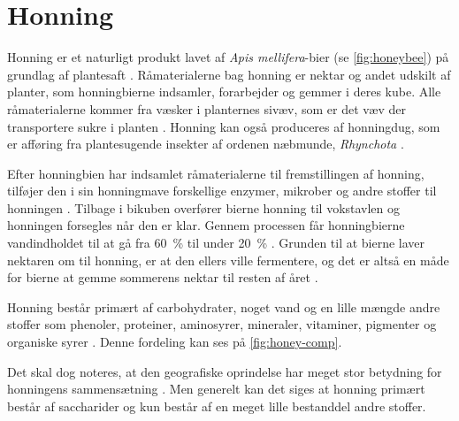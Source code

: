 \chapter{Honning}

Honning er et naturligt produkt lavet af \textit{Apis mellifera}-bier (se \cref{fig:honeybee}) på grundlag af plantesaft \parencite{honneyLex}.
Råmaterialerne bag honning er nektar og andet udskilt af planter, som honningbierne indsamler, forarbejder og gemmer i deres kube.
Alle råmaterialerne kommer fra væsker i planternes sivæv, som er det væv der transportere sukre i planten \parencite{sivævLex}.
\newline Honning kan også produceres af honningdug, som er afføring fra plantesugende insekter af ordenen næbmunde, \textit{Rhynchota} \parencite{honeybook}.
\par Efter honningbien har indsamlet råmaterialerne til fremstillingen af honning, tilføjer den i sin honningmave forskellige enzymer, mikrober og andre stoffer til honningen \parencite{sugarhoney}.
Tilbage i bikuben overfører bierne honning til vokstavlen og honningen forsegles når den er klar.
Gennem processen får honningbierne vandindholdet til at gå fra \qty{60}{\percent} til under \qty{20}{\percent} \parencite{honeybook}.
Grunden til at bierne laver nektaren om til honning, er at den ellers ville fermentere, og det er altså en måde for bierne at gemme sommerens nektar til resten af året \parencite{honeychem}.
\par Honning består primært af carbohydrater, noget vand og en lille mængde andre stoffer som phenoler, proteiner, aminosyrer, mineraler, vitaminer, pigmenter og organiske syrer \parencite{sugarhoney}.
Denne fordeling kan ses på \cref{fig:honey-comp}.

Det skal dog noteres, at den geografiske oprindelse har meget stor betydning for honningens sammensætning \parencite{geohoney}.
Men generelt kan det siges at honning primært består af saccharider og kun består af en meget lille bestanddel andre stoffer.
